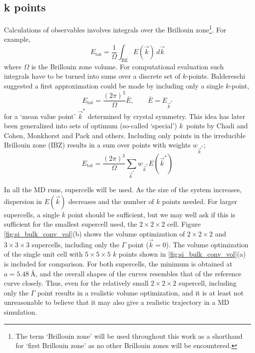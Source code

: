 \documentclass[11pt,bibliography=totoc,index=totoc]{scrbook}   %
\begin{document}
\subsection{k points}

Calculations of observables involves integrals over the Brillouin zone\footnote{The term `Brillouin zone' will be used throughout this work as
a shorthand for `first Brillouin zone' as no other Brillouin zones will be encountered.}. For example,
\begin{equation}
  E_{\text{tot}} = \frac{1}{\Omega} \int_{\text{BZ}} E(\vec{k}) \,d\vec{k}
\end{equation}
where $\Omega$ is the Brillouin zone volume. For computational evaluation such integrals have to be turned into sums over a discrete set of $k$-points. 
Baldereschi suggested a first approximation could be made by including only a single $k$-point,
\begin{equation}
  E_{\text{tot}} = \frac{(2\pi)^3}{\Omega} \bar{E}, \qquad \bar{E}=E_{\vec{k}^*}
\end{equation}
for a `mean value point' $\vec{k}^*$ determined by crystal symmetry\cite{Baldereschi:1973}. 
This idea has later been generalized into sets of optimum (so-called `special') $k$~points by Chadi and Cohen\cite{Chadi:1973},
Monkhorst and Pack\cite{MonkhorstPack:1976} and others.
Including only points in the irreducible Brillouin zone (IBZ) results in a sum over points with weights $w_{\vec{k}^*}$;
\begin{equation}
  E_{\text{tot}} = \frac{(2\pi)^3}{\Omega}\sum_{\vec{k}^*} w_{\vec{k}^*} E(\vec{k}^*)
\end{equation}

In all the MD runs, supercells will be used. As the size of the system increases, dispersion in $E(\vec{k})$ decreases and the number of $k$ points needed.
For larger supercells, a single $k$ point should be sufficient, but we may well ask if this is sufficient for the smallest supercell used, the $2\times2\times2$ cell. 
Figure \ref{fig:si_bulk_conv_vol}(b) shows the volume optimization of $2\times2\times2$ and $3\times3\times3$ supercells,
including only the $\Gamma$ point ($\vec{k}=0$). The volume optimization of the single unit cell with $5\times 5\times5$ $k$ points shown
in \ref{fig:si_bulk_conv_vol}(a) is included for comparison. For both supercells, the minimum is obtained at $a=\SI{5.48}{\angstrom}$,
and the overall shapes of the curves resembles that of the reference curve closely.
Thus, even for the relatively small $2\times 2\times 2$ supercell, including only the $\Gamma$ point results in a realistic volume optimization,
and it is at least not unreasonable to believe that it may also give a realistic trajectory in a MD simulation. 
\end{document}

